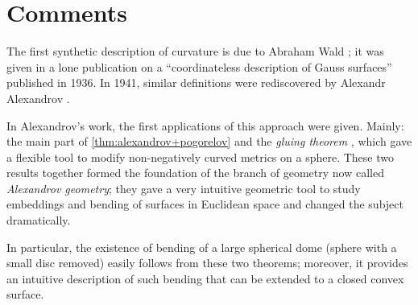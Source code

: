 \section{Comments}

The first synthetic description of curvature is due to Abraham Wald \cite{wald}; 
it was given in a lone publication on a ``coordinateless description of Gauss surfaces'' published in 1936.
In 1941, similar definitions were rediscovered by Alexandr Alexandrov \cite{alexandrov:def}.

In Alexandrov's work, the first applications of this approach were given.
Mainly: the main part of \ref{thm:alexandrov+pogorelov} \cite{alexandrov-1941,alexandrov-1941convex}
and the {}\emph{gluing theorem} \cite{alexandrov-1946}, which gave a flexible tool to modify non-negatively curved metrics on a sphere.
These two results together formed the foundation of the branch of geometry now called {}\emph{Alexandrov geometry};
they gave  a very intuitive geometric tool to study embeddings and bending of surfaces in Euclidean space and changed the subject dramatically.

In particular, the existence of bending of a large spherical dome (sphere with a small disc removed) easily follows from these two theorems; moreover, it provides an intuitive description of such bending that can be extended to a closed convex surface.




